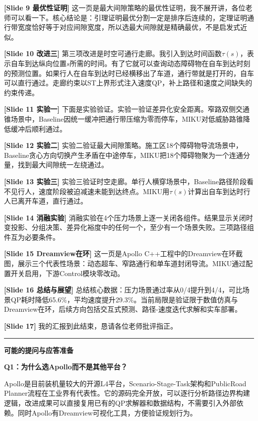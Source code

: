 \documentclass[a4paper,11pt]{ctexart}
\begin{document}
\textbf{[Slide 9 最优性证明]}
这一页是最大间隙策略的最优性证明，我不展开讲，各位老师可以看一下。核心结论是：引理证明最优分割一定是排序后连续的，定理证明通行带宽度恰好等于对应间隙宽度，所以选最大间隙就是精确最优，不是启发式近似。

\textbf{[Slide 10 改进三]}
第三项改进是时空可通行走廊。我引入到达时间函数$\tau(s)$，表示自车到达纵向位置$s$所需的时间。有了它就可以查询动态障碍物在自车到达时刻的预测位置。如果行人在自车到达时已经横移出了车道，通行带就是打开的，自车可以直行通过。走廊约束以ST上界形式注入速度QP，补上路径和速度之间缺失的约束传递。

\textbf{[Slide 11 实验一]}
下面是实验验证。实验一验证差异化安全距离。窄路双侧交通锥场景中，Baseline因统一缓冲把通行带压缩为零而停车，MIKU对低威胁路锥降低缓冲后顺利通过。

\textbf{[Slide 12 实验二]}
实验二验证最大间隙策略。施工区18个障碍物导流场景中，Baseline贪心方向切换产生矛盾在中途停车，MIKU把18个障碍物聚为一个连通分量，找到最大间隙统一左绕通过。

\textbf{[Slide 13 实验三]}
实验三验证时空走廊。单行人横穿场景中，Baseline路径阶段看不见行人，速度阶段被迫减速未能到达终点。MIKU用$\tau(s)$计算出自车到达时行人已离开车道，直行通过。

\textbf{[Slide 14 消融实验]}
消融实验在4个压力场景上逐一关闭各组件。结果显示关闭时变投影、分组决策、差异化裕度中的任何一个，至少有一个场景失败。三项路径组件互为必要条件。

\textbf{[Slide 15 Dreamview在环]}
这一页是Apollo C++工程中的Dreamview在环截图，展示三个代表性场景：动态超车、窄路通行和单车道封闭导流。MIKU通过配置开关启用，下游Control模块零改动。

\textbf{[Slide 16 总结与展望]}
总结核心数据：压力场景通过率从0/4提升到4/4，可比场景QP耗时降低65.6\%，平均速度提升29.3\%。当前局限是验证限于数值仿真与Dreamview在环，后续方向包括交互式预测、路径-速度迭代求解和实车部署。

\textbf{[Slide 17]}
我的汇报到此结束，恳请各位老师批评指正。

\bigskip
\hrule
\bigskip

\textbf{可能的提问与应答准备}

\textbf{Q1：为什么选Apollo而不是其他平台？}

Apollo是目前装机量较大的开源L4平台，Scenario-Stage-Task架构和PublicRoad Planner流程在工业界有代表性。它的源码完全开放，可以逐行分析路径边界构建逻辑，改进成果可以直接复用已有的QP求解器和数据结构，不需要引入外部依赖。同时Apollo有Dreamview可视化工具，方便验证规划行为。
\end{document}
